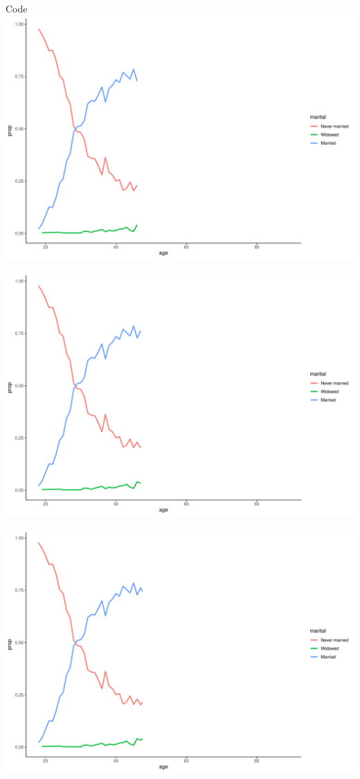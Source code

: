 \documentclass[
  ignorenonframetext,
]{beamer}
\begin{document}
\begin{frame}[fragile]{Code}
\includegraphics{gss_cat_files/figure-beamer/unnamed-chunk-1-44.pdf}

\includegraphics{gss_cat_files/figure-beamer/unnamed-chunk-1-45.pdf}

\includegraphics{gss_cat_files/figure-beamer/unnamed-chunk-1-46.pdf}


\end{frame}
\end{document}
